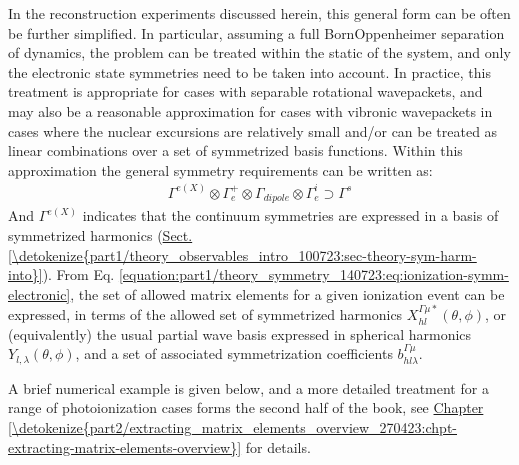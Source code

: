 \documentclass[letterpaper,table,10pt,english]{jupyterBook}
\begin{document}
\sphinxAtStartPar
In the reconstruction experiments discussed herein, this general form can be often be further simplified. In particular, assuming a full Born\sphinxhyphen{}Oppenheimer separation of dynamics, the problem can be treated within the static {\hyperref[\detokenize{backmatter/glossary:term-PG}]{}} of the system, and only the electronic state symmetries need to be taken into account. In practice, this treatment is appropriate for cases with separable rotational wavepackets, and may also be a reasonable approximation for cases with vibronic wavepackets in cases where the nuclear excursions are relatively small and/or can be treated as linear combinations over a set of symmetrized basis functions. Within this approximation the general symmetry requirements can be written as:
\begin{equation}\label{equation:part1/theory_symmetry_140723:eq:ionization-symm-electronic}
\begin{split}
\Gamma^{e(X)}\otimes\Gamma_{e}^{+}\otimes\Gamma_{dipole}\otimes\Gamma_{e}^{i}\supset\Gamma^{s}
\end{split}
\end{equation}
\sphinxAtStartPar
And \(\Gamma^{e(X)}\) indicates that the continuum symmetries are expressed in a basis of symmetrized harmonics (\hyperref[\detokenize{part1/theory_observables_intro_100723:sec-theory-sym-harm-into}]{Sect.\@ \ref{\detokenize{part1/theory_observables_intro_100723:sec-theory-sym-harm-into}}}). From Eq. \eqref{equation:part1/theory_symmetry_140723:eq:ionization-symm-electronic}, the set of allowed matrix elements for a given ionization event can be expressed, in terms of the allowed set of symmetrized harmonics \(X_{hl}^{\Gamma\mu*}(\theta,\phi)\), or (equivalently) the usual partial wave basis expressed in spherical harmonics \(Y_{l,\lambda}(\theta,\phi)\), and a set of associated symmetrization coefficients \(b_{hl\lambda}^{\Gamma\mu}\).

\sphinxAtStartPar
A brief numerical example is given below, and a more detailed treatment for a range of photoionization cases forms the second half of the book, see \hyperref[\detokenize{part2/extracting_matrix_elements_overview_270423:chpt-extracting-matrix-elements-overview}]{Chapter \ref{\detokenize{part2/extracting_matrix_elements_overview_270423:chpt-extracting-matrix-elements-overview}}} for details.
\end{document}
